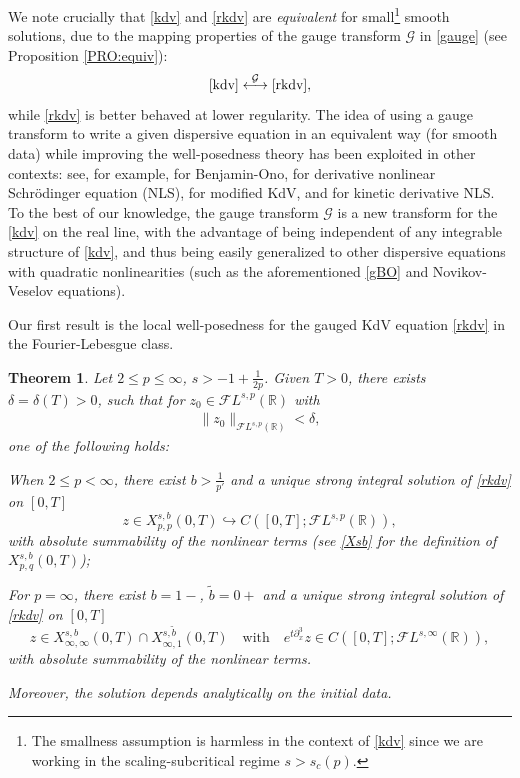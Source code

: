 \documentclass[a4paper,
11pt,  reqno]{amsart}
\newcommand{\5}{\textup{V}}
\newcommand{\noi}{\noindent}
\newcommand{\FL}{\mathcal{F} L}
\newcommand{\dl}{\delta}
\newtheorem{theorem}{Theorem} [section]
\theoremstyle{remark}
\newcommand{\R}{\mathbb{R}}
\newcommand{\Gc}{\mathcal{G}}
\numberwithin{equation}{section}
\numberwithin{theorem}{section}
\begin{document}
    We note crucially that \eqref{kdv} and \eqref{rkdv} are \textit{equivalent} for small\footnote{The smallness assumption is harmless in the context of \eqref{kdv} since we are working in the scaling-subcritical regime $s>s_c(p)$.} smooth solutions, due to the mapping properties of the gauge transform $\Gc$ in \eqref{gauge} (see Proposition \ref{PRO:equiv}):
    $$
\eqref{kdv} \overset{\Gc}{\longleftrightarrow} \eqref{rkdv},
    $$
while \eqref{rkdv} is better behaved at lower regularity.
The idea of using a gauge transform to write a given dispersive equation in an equivalent way (for smooth data) while improving the well-posedness theory has been exploited in other contexts: see, for example,   \cite{IfrimTataru, MolinetPilod_bo, tao_bo} for Benjamin-Ono, \cite{CKSTT_dnls, Herr_dnls, takaoka_dnls} for derivative nonlinear Schr\"odinger equation (NLS), \cite{Chapouto_FL_mkdv} for modified KdV, and \cite{KishimotoTsutsumi_kdnls} for kinetic derivative NLS.
To the best of our knowledge, the gauge transform $\Gc$ is a new transform for the \eqref{kdv} on the real line, with the advantage of being independent of
any integrable structure of \eqref{kdv}, and thus being easily generalized to other dispersive equations with quadratic nonlinearities (such as the aforementioned \eqref{gBO} and Novikov-Veselov equations).

\medskip

 Our first result is the local well-posedness for the gauged KdV equation \eqref{rkdv} in the Fourier-Lebesgue class.

	\begin{theorem}\label{thm:lwp_rkdv}
Let $2 \le p \le \infty$, $s> - 1 + \frac1{2p}$. Given $T>0$, there exists $\dl = \dl(T)>0$, such that for $z_0 \in \FL^{s, p}(\R)$ with
\begin{align}
    \|z_0\|_{\FL^{s,p}(\R)} < \dl,
\end{align}
one of the following holds:

\vspace{1mm}

\noi{\rm(i)}
When $ 2 \le p <\infty$,
there exist $b>\frac{1}{p'}$ and  a unique strong integral solution of \eqref{rkdv} on $[0,T]$
	$$z\in X^{s,b}_{p, p}(0,T)\hookrightarrow C([0,T]; \mathcal{F}L^{s,p}(\R)),$$
    with absolute summability of the nonlinear terms (see \eqref{Xsb} for the definition of $X^{s,b}_{p,q}(0,T)$);

\vspace{1mm}

\smallskip
\noi{\rm(ii)}
For $p=\infty$, there exist $b=1-$, $\tilde{b}=0+$ and a unique strong integral solution of \eqref{rkdv} on $[0,T]$
	$$z\in X^{s,b}_{\infty,\infty}(0,T)\cap X^{s,\tilde{b}}_{\infty,1}(0,T)
    \quad
    \text{with}
    \quad
    e^{t\partial_x^3}z \in C([0,T]; \mathcal{F}L^{s,\infty}(\R))
    ,
    $$
    with absolute summability of the nonlinear terms.

\smallskip
\noi
    Moreover, the solution depends analytically on the initial data.
\end{theorem}
\end{document}
